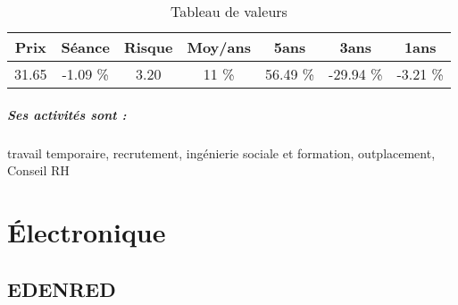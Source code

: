 \documentclass[11pt,a4paper]{report}%
\begin{document}
\begin{table}[H]
  \centering
    \begin{tabular}{|c|c|c|c|c|c|c|}
    \hline
    Prix & Séance & Risque  & Moy/ans & 5ans & 3ans & 1ans \\
    \hline
    31.65 &    -1.09 \%    & 3.20 & 11 \% & 56.49 \% & -29.94 \% & -3.21 \% \\
    \hline
    \end{tabular}%
        \label{tab:table_SYNERGIE}%
      \caption{Tableau de valeurs}
\end{table}%

\paragraph{Ses activités sont : } travail temporaire, recrutement, ingénierie sociale et formation, outplacement, Conseil RH 
    
    \newpage\chapter{Électronique}


\section{EDENRED}
\end{document}
